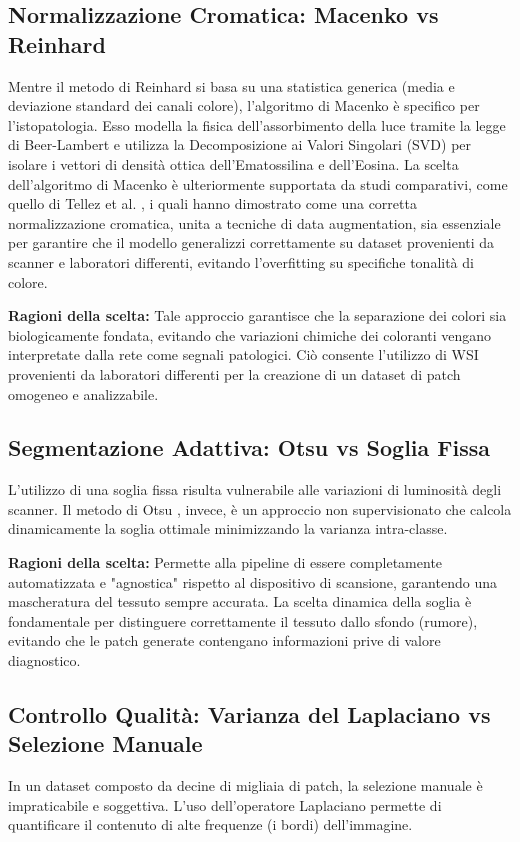 \subsection{Normalizzazione Cromatica: Macenko vs Reinhard} 
Mentre il metodo di Reinhard si basa su una statistica generica (media e deviazione standard dei canali colore), l'algoritmo di Macenko \cite{macenko2009method} è specifico per l'istopatologia. Esso modella la fisica dell'assorbimento della luce tramite la legge di Beer-Lambert e utilizza la Decomposizione ai Valori Singolari (SVD) per isolare i vettori di densità ottica dell'Ematossilina e dell'Eosina. La scelta dell'algoritmo di Macenko è ulteriormente supportata da studi comparativi, come quello di Tellez et al. \cite{tellez2019quantifying}, i quali hanno dimostrato come una corretta normalizzazione cromatica, unita a tecniche di data augmentation, sia essenziale per garantire che il modello generalizzi correttamente su dataset provenienti da scanner e laboratori differenti, evitando l'overfitting su specifiche tonalità di colore.



\textbf{Ragioni della scelta:} Tale approccio garantisce che la separazione dei colori sia biologicamente fondata, evitando che variazioni chimiche dei coloranti vengano interpretate dalla rete come segnali patologici. Ciò consente l'utilizzo di WSI provenienti da laboratori differenti per la creazione di un dataset di patch omogeneo e analizzabile.

\subsection{Segmentazione Adattiva: Otsu vs Soglia Fissa} 
L'utilizzo di una soglia fissa risulta vulnerabile alle variazioni di luminosità degli scanner. Il metodo di Otsu \cite{otsu1979threshold}, invece, è un approccio non supervisionato che calcola dinamicamente la soglia ottimale minimizzando la varianza intra-classe.

\textbf{Ragioni della scelta:} Permette alla pipeline di essere completamente automatizzata e "agnostica" rispetto al dispositivo di scansione, garantendo una mascheratura del tessuto sempre accurata. La scelta dinamica della soglia è fondamentale per distinguere correttamente il tessuto dallo sfondo (rumore), evitando che le patch generate contengano informazioni prive di valore diagnostico.



\subsection{Controllo Qualità: Varianza del Laplaciano vs Selezione Manuale} 
In un dataset composto da decine di migliaia di patch, la selezione manuale è impraticabile e soggettiva. L'uso dell'operatore Laplaciano permette di quantificare il contenuto di alte frequenze (i bordi) dell'immagine.

